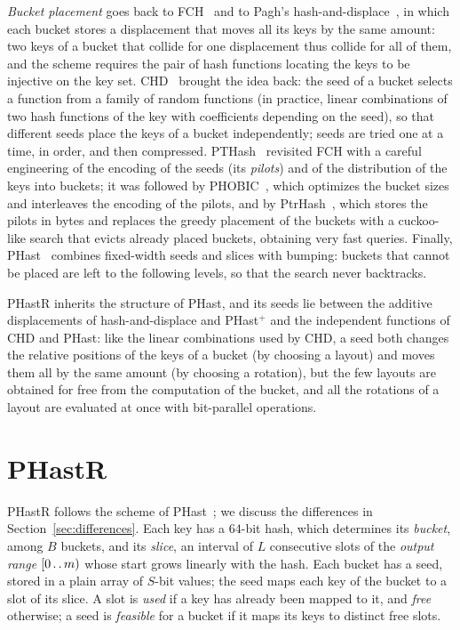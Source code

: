 \documentclass[11pt]{article}
\def\..{\,\mathpunct{\ldotp\ldotp}} %
\newcommand{\PHast}{PHast\xspace}
\newcommand{\PHastP}{PHast$^+$\xspace}
\newcommand{\PHastR}{PHastR\xspace}
\begin{document}
\emph{Bucket placement} goes back to FCH~\cite{FCHFACMPHF} and to Pagh's
hash-and-displace~\cite{PagHDEEMPHF}, in which each bucket stores a displacement
that moves all its keys by the same amount: two keys of a bucket that collide
for one displacement thus collide for all of them, and the scheme requires the
pair of hash functions locating the keys to be injective on the key set.
CHD~\cite{BBDHDC} brought the idea back: the seed of a bucket selects a function
from a family of random functions (in practice, linear combinations of two hash
functions of the key with coefficients depending on the seed), so that different
seeds place the keys of a bucket independently; seeds are tried one at a time,
in order, and then compressed. PTHash~\cite{PTPRFMPH} revisited FCH with a
careful engineering of the encoding of the seeds (its \emph{pilots}) and of the
distribution of the keys into buckets; it was followed by
PHOBIC~\cite{HLPPPHOBSIC}, which optimizes the bucket sizes and interleaves the
encoding of the pilots, and by PtrHash~\cite{RagPTR}, which stores the pilots in
bytes and replaces the greedy placement of the buckets with a cuckoo-like search
that evicts already placed buckets, obtaining very fast queries. Finally,
\PHast~\cite{BeSPHast} combines fixed-width seeds and slices with bumping: buckets
that cannot be placed are left to the following levels, so that the search never
backtracks.

\PHastR inherits the structure of \PHast, and its seeds lie between the
additive displacements of hash-and-displace and \PHastP and the independent
functions of CHD and \PHast: like the linear combinations used by CHD, a seed
both changes the relative positions of the keys of a bucket (by choosing a
layout) and moves them all by the same amount (by choosing a rotation), but
the few layouts are obtained for free from the computation of the bucket,
and all the rotations of a layout are evaluated at once with bit-parallel
operations.

\section{\PHastR}
\label{sec:phastr}

\PHastR follows the scheme of \PHast~\cite{BeSPHast}; we discuss the
differences in Section~\ref{sec:differences}. Each key has a $64$-bit hash,
which determines its \emph{bucket}, among $B$ buckets, and its \emph{slice},
an interval of $L$ consecutive slots of the \emph{output range} $[0\..m)$
whose start grows linearly with the hash. Each bucket has a seed, stored in a
plain array of $S$-bit values; the seed maps each key of the bucket to a slot
of its slice. A slot is \emph{used} if a key has already been mapped to it, and
\emph{free} otherwise; a seed is \emph{feasible} for a bucket if it maps its
keys to distinct free slots.
\end{document}
